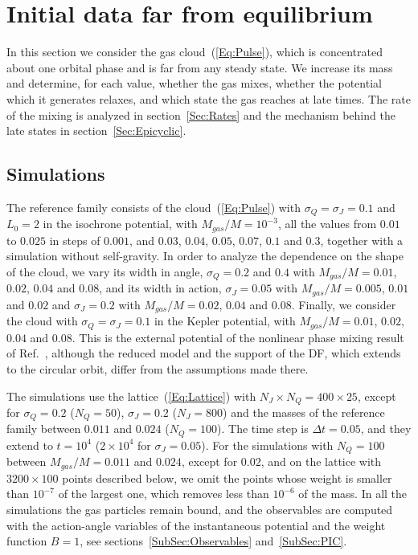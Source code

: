 \section{Initial data far from equilibrium}
\label{Sec:FarFromEq}

In this section we consider the gas cloud~(\ref{Eq:Pulse}), which is concentrated about one orbital phase and is far from any steady state. We increase its mass and determine, for each value, whether the gas mixes, whether the potential which it generates relaxes, and which state the gas reaches at late times. The rate of the mixing is analyzed in section~\ref{Sec:Rates} and the mechanism behind the late states in section~\ref{Sec:Epicyclic}.


\subsection{Simulations}
\label{SubSec:FarSims}

The reference family consists of the cloud~(\ref{Eq:Pulse}) with $\sigma_Q = \sigma_J = 0.1$ and $L_0 = 2$ in the isochrone potential, with $M_{gas}/M = 10^{-3}$, all the values from $0.01$ to $0.025$ in steps of $0.001$, and $0.03$, $0.04$, $0.05$, $0.07$, $0.1$ and $0.3$, together with a simulation without self-gravity. In order to analyze the dependence on the shape of the cloud, we vary its width in angle, $\sigma_Q = 0.2$ and $0.4$ with $M_{gas}/M = 0.01$, $0.02$, $0.04$ and $0.08$, and its width in action, $\sigma_J = 0.05$ with $M_{gas}/M = 0.005$, $0.01$ and $0.02$ and $\sigma_J = 0.2$ with $M_{gas}/M = 0.02$, $0.04$ and $0.08$. Finally, we consider the cloud with $\sigma_Q = \sigma_J = 0.1$ in the Kepler potential, with $M_{gas}/M = 0.01$, $0.02$, $0.04$ and $0.08$. This is the external potential of the nonlinear phase mixing result of Ref.~\cite{sCjL26}, although the reduced model and the support of the DF, which extends to the circular orbit, differ from the assumptions made there.

The simulations use the lattice~(\ref{Eq:Lattice}) with $N_J\times N_Q = 400\times 25$, except for $\sigma_Q = 0.2$ ($N_Q = 50$), $\sigma_J = 0.2$ ($N_J = 800$) and the masses of the reference family between $0.011$ and $0.024$ ($N_Q = 100$). The time step is $\Delta t = 0.05$, and they extend to $t = 10^4$ ($2\times 10^4$ for $\sigma_J = 0.05$). For the simulations with $N_Q = 100$ between $M_{gas}/M = 0.011$ and $0.024$, except for $0.02$, and on the lattice with $3200\times 100$ points described below, we omit the points whose weight is smaller than $10^{-7}$ of the largest one, which removes less than $10^{-6}$ of the mass. In all the simulations the gas particles remain bound, and the observables are computed with the action-angle variables of the instantaneous potential and the weight function $B = 1$, see sections~\ref{SubSec:Observables} and~\ref{SubSec:PIC}.

